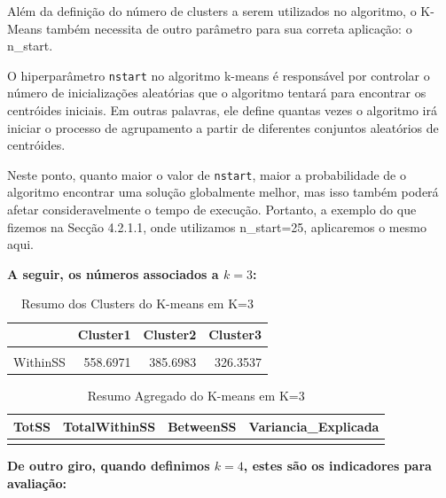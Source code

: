 \documentclass[
  letterpaper,
  DIV=11,
  numbers=noendperiod]{scrartcl}
\begin{document}
Além da definição do número de clusters a serem utilizados no algoritmo,
o K-Means também necessita de outro parâmetro para sua correta
aplicação: o n\_start.

O hiperparâmetro \texttt{nstart} no algoritmo k-means é responsável por
controlar o número de inicializações aleatórias que o algoritmo tentará
para encontrar os centróides iniciais. Em outras palavras, ele define
quantas vezes o algoritmo irá iniciar o processo de agrupamento a partir
de diferentes conjuntos aleatórios de centróides.

Neste ponto, quanto maior o valor de \texttt{nstart}, maior a
probabilidade de o algoritmo encontrar uma solução globalmente melhor,
mas isso também poderá afetar consideravelmente o tempo de execução.
Portanto, a exemplo do que fizemos na Secção 4.2.1.1, onde utilizamos
n\_start=25, aplicaremos o mesmo aqui.

\textbf{A seguir, os números associados a \(k=3\):}

\begingroup\fontsize{12}{14}\selectfont

\begin{longtable}[t]{lrrr}
\caption{\label{tab:unnamed-chunk-35}Resumo dos Clusters do K-means em K=3}\\
\toprule
  & Cluster1 & Cluster2 & Cluster3\\
\midrule
\cellcolor{gray!15}{Cluster} & \cellcolor{gray!15}{1.0000} & \cellcolor{gray!15}{2.0000} & \cellcolor{gray!15}{3.0000}\\
WithinSS & 558.6971 & 385.6983 & 326.3537\\
\bottomrule
\end{longtable}
\endgroup{}

\begingroup\fontsize{12}{14}\selectfont

\begin{longtable}[t]{rrrr}
\caption{\label{tab:unnamed-chunk-35}Resumo Agregado do K-means em K=3}\\
\toprule
TotSS & TotalWithinSS & BetweenSS & Variancia\_Explicada\\
\midrule
\cellcolor{gray!15}{2301} & \cellcolor{gray!15}{1270.749} & \cellcolor{gray!15}{1030.251} & \cellcolor{gray!15}{44.77405}\\
\bottomrule
\end{longtable}
\endgroup{}

\textbf{De outro giro, quando definimos \(k=4\), estes são os
indicadores para avaliação:}

\begingroup\fontsize{12}{14}\selectfont
\end{document}
